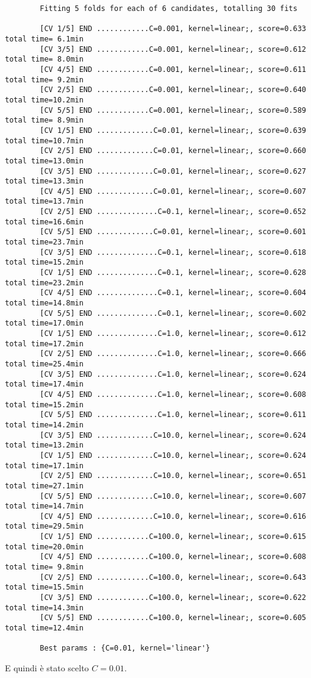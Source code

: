 \documentclass[../../Report.tex]{subfiles}
\begin{document}
    \begin{center}
   
        \scriptsize\begin{verbatim}
        Fitting 5 folds for each of 6 candidates, totalling 30 fits

        [CV 1/5] END ............C=0.001, kernel=linear;, score=0.633 total time= 6.1min
        [CV 3/5] END ............C=0.001, kernel=linear;, score=0.612 total time= 8.0min
        [CV 4/5] END ............C=0.001, kernel=linear;, score=0.611 total time= 9.2min
        [CV 2/5] END ............C=0.001, kernel=linear;, score=0.640 total time=10.2min
        [CV 5/5] END ............C=0.001, kernel=linear;, score=0.589 total time= 8.9min
        [CV 1/5] END .............C=0.01, kernel=linear;, score=0.639 total time=10.7min
        [CV 2/5] END .............C=0.01, kernel=linear;, score=0.660 total time=13.0min
        [CV 3/5] END .............C=0.01, kernel=linear;, score=0.627 total time=13.3min
        [CV 4/5] END .............C=0.01, kernel=linear;, score=0.607 total time=13.7min
        [CV 2/5] END ..............C=0.1, kernel=linear;, score=0.652 total time=16.6min
        [CV 5/5] END .............C=0.01, kernel=linear;, score=0.601 total time=23.7min
        [CV 3/5] END ..............C=0.1, kernel=linear;, score=0.618 total time=15.2min
        [CV 1/5] END ..............C=0.1, kernel=linear;, score=0.628 total time=23.2min
        [CV 4/5] END ..............C=0.1, kernel=linear;, score=0.604 total time=14.8min
        [CV 5/5] END ..............C=0.1, kernel=linear;, score=0.602 total time=17.0min
        [CV 1/5] END ..............C=1.0, kernel=linear;, score=0.612 total time=17.2min
        [CV 2/5] END ..............C=1.0, kernel=linear;, score=0.666 total time=25.4min
        [CV 3/5] END ..............C=1.0, kernel=linear;, score=0.624 total time=17.4min
        [CV 4/5] END ..............C=1.0, kernel=linear;, score=0.608 total time=15.2min
        [CV 5/5] END ..............C=1.0, kernel=linear;, score=0.611 total time=14.2min
        [CV 3/5] END .............C=10.0, kernel=linear;, score=0.624 total time=13.2min
        [CV 1/5] END .............C=10.0, kernel=linear;, score=0.624 total time=17.1min
        [CV 2/5] END .............C=10.0, kernel=linear;, score=0.651 total time=27.1min
        [CV 5/5] END .............C=10.0, kernel=linear;, score=0.607 total time=14.7min
        [CV 4/5] END .............C=10.0, kernel=linear;, score=0.616 total time=29.5min
        [CV 1/5] END ............C=100.0, kernel=linear;, score=0.615 total time=20.0min
        [CV 4/5] END ............C=100.0, kernel=linear;, score=0.608 total time= 9.8min
        [CV 2/5] END ............C=100.0, kernel=linear;, score=0.643 total time=15.5min
        [CV 3/5] END ............C=100.0, kernel=linear;, score=0.622 total time=14.3min
        [CV 5/5] END ............C=100.0, kernel=linear;, score=0.605 total time=12.4min

        Best params : {C=0.01, kernel='linear'}
        \end{verbatim}
   \end{center}
    \normalsize

    E quindi è stato scelto $C=0.01$.
\end{document}
